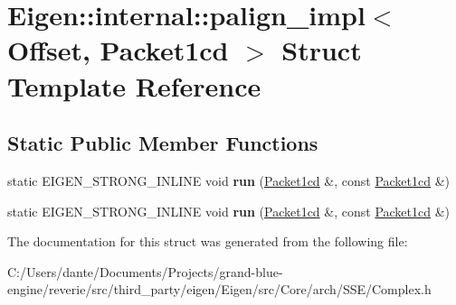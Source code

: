 \hypertarget{struct_eigen_1_1internal_1_1palign__impl_3_01_offset_00_01_packet1cd_01_4}{}\section{Eigen\+::internal\+::palign\+\_\+impl$<$ Offset, Packet1cd $>$ Struct Template Reference}
\label{struct_eigen_1_1internal_1_1palign__impl_3_01_offset_00_01_packet1cd_01_4}
\subsection*{Static Public Member Functions}
\begin{DoxyCompactItemize}
\item 
\mbox{\label{struct_eigen_1_1internal_1_1palign__impl_3_01_offset_00_01_packet1cd_01_4_ac1744967710606c722b358f1b2349acd}} 
static E\+I\+G\+E\+N\+\_\+\+S\+T\+R\+O\+N\+G\+\_\+\+I\+N\+L\+I\+NE void {\bfseries run} (\mbox{\hyperlink{struct_eigen_1_1internal_1_1_packet1cd}{Packet1cd}} \&, const \mbox{\hyperlink{struct_eigen_1_1internal_1_1_packet1cd}{Packet1cd}} \&)
\item 
\mbox{\label{struct_eigen_1_1internal_1_1palign__impl_3_01_offset_00_01_packet1cd_01_4_ac1744967710606c722b358f1b2349acd}} 
static E\+I\+G\+E\+N\+\_\+\+S\+T\+R\+O\+N\+G\+\_\+\+I\+N\+L\+I\+NE void {\bfseries run} (\mbox{\hyperlink{struct_eigen_1_1internal_1_1_packet1cd}{Packet1cd}} \&, const \mbox{\hyperlink{struct_eigen_1_1internal_1_1_packet1cd}{Packet1cd}} \&)
\end{DoxyCompactItemize}


The documentation for this struct was generated from the following file\+:\begin{DoxyCompactItemize}
\item 
C\+:/\+Users/dante/\+Documents/\+Projects/grand-\/blue-\/engine/reverie/src/third\+\_\+party/eigen/\+Eigen/src/\+Core/arch/\+S\+S\+E/Complex.\+h\end{DoxyCompactItemize}

